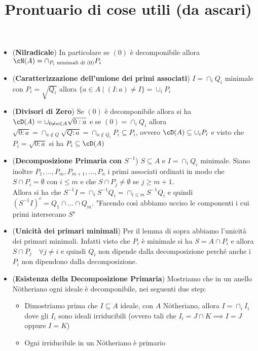 \documentclass[a4paper,NoNotes,GeneralMath]{stdmdoc}
\begin{document}
\begin{itemize}
		\item ({\bf Nilradicale}) In particolare se $(0)$ è decomponibile allora $\cN(A) = \cap_{P_i \text{ minimali di } (0)} P_i$
		\item ({\bf Caratterizzazione dell'unione dei primi associati}) $I = \cap_i Q_i$ minimale con $P_i = \sqrt{Q_i}$ allora $\{ a \in A \mid (I:a) \neq I \} = \cup_i P_i$
		\item ({\bf Divisori di Zero}) Se $(0)$ è decomponibile allora si ha $\cD(A) = \cup_{0 \neq a \in A} \sqrt{0 : a}$ e se $(0) = \cap_i Q_i$ allora $\sqrt{0:a} = \cap_{a \notin Q} \sqrt{Q:a} = \cap_{a \notin Q_i} P_i \subseteq P_i$, ovvero $\cD(A) \subseteq \cup_i P_i$ e visto che $P_i = \sqrt{0:a}$ si ha $P_i \subseteq \cD(A)$
		\item ({\bf Decomposizione Primaria con $S^{-1}$}) $S \subseteq A$ e $I = \cap_i Q_i$ minimale. Siano inoltre $P_1, \ldots, P_m, P_{m+1}, \ldots, P_n$ i primi associati ordinati in modo che $S \cap P_i = \emptyset$ con $i \le m$ e che $S \cap P_j \neq \emptyset$ se $j \ge m+1$. \\
		Allora si ha che $S^{-1}I = \cap_i S^{-1}Q_i = \cap_{i \le m} S^{-1}Q_i$ e quindi $(S^{-1}I)^c = Q_1 \cap \ldots \cap Q_m$. "Facendo così abbiamo ucciso le componenti i cui primi intersecano $S$" 
		\item ({\bf Unicità dei primari minimali}) Per il lemma di sopra abbiamo l'unicità dei primari minimali. Infatti visto che $P_i$ è minimale si ha $S = A \cap P_i$ e allora $S \cap P_j \quad \forall j \neq i$ e quindi $Q_i$ non dipende dalla decomposizione perché anche i $P_i$ non dipendono dalla decomposizione.
		\item ({\bf Esistenza della Decomposizione Primaria}) Mostriamo che in un anello Nötheriano ogni ideale è decomponibile, nei seguenti due step:
			\begin{itemize}
				\item Dimostriamo prima che $I \subseteq A$ ideale, con $A$ Nötheriano, allora $I = \cap_i I_i$ dove gli $I_i$ sono ideali irriducibili (ovvero tali che $I_i = J \cap K \implies I = J$ oppure $I = K$)
				\item Ogni irriducibile in un Nötheriano è primario
			\end{itemize}
	\end{itemize}
	
	\clearpage
	\title {Prontuario di cose utili (da ascari)}
\end{document}
